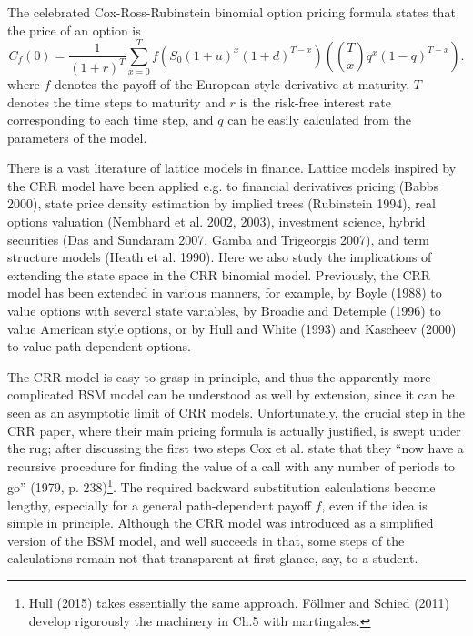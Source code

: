 \documentclass{amsart}
\theoremstyle{definition}
\theoremstyle{remark}
\numberwithin{equation}{section}
\newcommand{\1}{\boldsymbol{1}}
\begin{document}
The celebrated Cox-Ross-Rubinstein binomial option pricing formula states that the price of an option is
\begin{equation}\label{eq: CRRformula}
C_f(0)=\frac{1}{(1+r)^T}\sum_{x=0}^T f\left(S_0(1+u)^x(1+d)^{T-x}\right)\left(\binom{T}{x}q^x(1-q)^{T-x}\right).
\end{equation}
where $f$ denotes the payoff of the European style derivative at maturity, $T$ denotes the time steps to maturity and $r$  is the risk-free interest rate corresponding to each time step, and $q$ can be easily calculated from the parameters of the model.  

There is a vast literature of lattice models in finance. Lattice models inspired by the CRR model have been applied e.g. to financial derivatives pricing (Babbs 2000), state price density estimation by implied trees (Rubinstein 1994), real options valuation (Nembhard et al. 2002, 2003), investment science, hybrid securities (Das and Sundaram 2007, Gamba and Trigeorgis 2007), and term structure models (Heath et al. 1990). Here we also study the implications of extending the state space in the CRR binomial model. Previously, the CRR model has been extended in various manners, for example, by Boyle (1988) to value options with several state variables, by Broadie and Detemple (1996) to value American style options, or by Hull and White (1993) and Kascheev (2000) to value path-dependent options.



The CRR model is easy to grasp in principle, and thus the apparently more complicated BSM model can be understood as well by extension, since it can be seen as an asymptotic limit of CRR models. Unfortunately, the crucial step in the CRR paper, where their main pricing formula is actually justified, is swept under the rug; after discussing the first two steps Cox et al. state that they ``now have a recursive procedure for finding the value of a call with any number of periods to go'' (1979, p. 238)\footnote{Hull (2015) takes essentially the same approach. 
F\"{o}llmer and Schied (2011) develop rigorously the machinery in Ch.5 with martingales.}. The required backward substitution calculations become lengthy, especially for a general path-dependent payoff $f$, even if the idea is simple in principle. Although the CRR model was introduced as a simplified version of the BSM model, and well succeeds in that, some steps of the calculations remain not that transparent at first glance, say, to a student.
\end{document}

